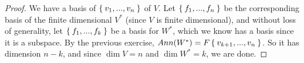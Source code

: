 \documentclass[10pt,oneside,reqno]{amsart}
\theoremstyle{plain}
\theoremstyle{definition}
\theoremstyle{remark}
\newcommand{\bb}{\vspace{3mm}}
\begin{document}
\begin{enumerate}[label=\arabic*.]
\begin{enumerate}
\begin{proof}
We have a basis of $\Set{v_1,...,v_n}$ of $V$.  Let $\Set{f_1,...,f_n}$ be the corresponding basis of the finite dimensional $V^*$ (since $V$ is finite dimensional), and without loss of generality, let $\Set{f_1,...,f_k}$ be a basis for $W^*$, which we know has a basis since it is a subspace. By the previous exercise, $Ann(W^*) = F\Set{v_{k + 1},...,v_n}$. So it has dimension $n - k$, and since $\dim V = n$ and $\dim W^* = k$, we are done. 
\end{proof}

\bb


\end{enumerate}

\end{enumerate}
\end{document}
